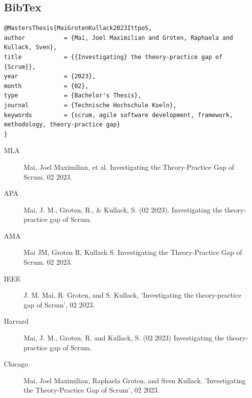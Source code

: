 \subsection*{BibTex}
\begin{lstlisting}[label={lst:HowToCite}]
@MastersThesis{MaiGrotenKullack2023IttpoS,
author           = {Mai, Joel Maximilian and Groten, Raphaela and Kullack, Sven},
title            = {{Investigating} the theory-practice gap of {Scrum}},
year             = {2023},
month            = {02},
type             = {Bachelor's Thesis},
journal          = {Technische Hochschule Koeln},
keywords         = {scrum, agile software development, framework, methodology, theory-practice gap}
}
\end{lstlisting}

\begin{description}
    \item[MLA] Mai, Joel Maximilian, et al. Investigating the Theory-Practice Gap of Scrum. 02 2023.
    \item[APA] Mai, J. M., Groten, R., \& Kullack, S. (02 2023). Investigating the theory-practice gap of Scrum.
    \item[AMA] Mai JM, Groten R, Kullack S. Investigating the Theory-Practice Gap of Scrum. 02 2023.
    \item[IEEE] J. M. Mai, R. Groten, and S. Kullack, 'Investigating the theory-practice gap of Scrum', 02 2023.
    \item[Harvard] Mai, J. M., Groten, R. and Kullack, S. (02 2023) Investigating the theory-practice gap of Scrum.
    \item[Chicago] Mai, Joel Maximilian, Raphaela Groten, and Sven Kullack. 'Investigating the Theory-Practice Gap of Scrum', 02 2023.
\end{description}

\renewcommand{\refname}{List of References}


\newpage
\listoffigures
	

